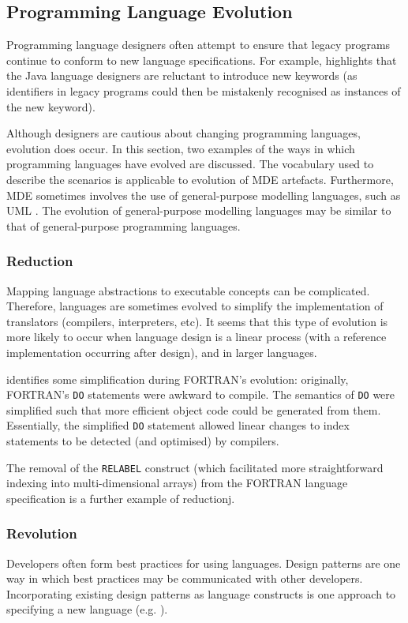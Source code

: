 \subsection{Programming Language Evolution}
Programming language designers often attempt to ensure that legacy programs continue to conform to new language specifications. For example, \cite{cervelle06tatoo} highlights that the Java \cite{java} language designers are reluctant to introduce new keywords (as identifiers in legacy programs could then be mistakenly recognised as instances of the new keyword).

Although designers are cautious about changing programming languages, evolution does occur. In this section, two examples of the ways in which programming languages have evolved are discussed. The vocabulary used to describe the scenarios is applicable to evolution of MDE artefacts. Furthermore, MDE sometimes involves the use of general-purpose modelling languages, such as UML \cite{uml212}. The evolution of general-purpose modelling languages may be similar to that of general-purpose programming languages.

\subsubsection{Reduction}
Mapping language abstractions to executable concepts can be complicated. Therefore, languages are sometimes evolved to simplify the implementation of translators (compilers, interpreters, etc). It seems that this type of evolution is more likely to occur when language design is a linear process (with a reference implementation occurring after design), and in larger languages.

\cite{backus78history} identifies some simplification during FORTRAN's evolution: originally, FORTRAN's \verb|DO| statements were awkward to compile. The semantics of \verb|DO| were simplified such that more efficient object code could be generated from them. Essentially, the simplified \verb|DO| statement allowed linear changes to index statements to be detected (and optimised) by compilers.

The removal of the \verb|RELABEL| construct (which facilitated more straightforward indexing into multi-dimensional arrays) from the FORTRAN language specification \cite{backus78history} is a further example of reductionj.

\subsubsection{Revolution}
Developers often form best practices for using languages. Design patterns are one way in which best practices may be communicated with other developers. Incorporating existing design patterns as language constructs is one approach to specifying a new language (e.g. \cite{bosch98patterns}).

